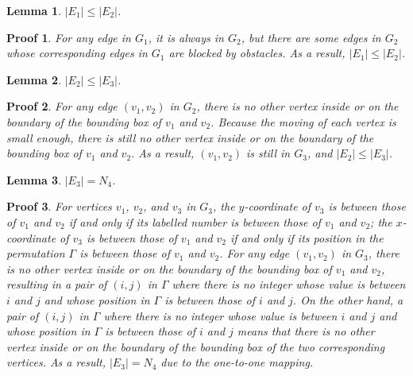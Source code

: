 \documentclass[]{article}
\newtheorem{Lemma}{Lemma}
\newtheorem{Proof}{Proof}
\begin{document}
\begin{qunlist}
{{%

\begin{Lemma}\label{lemma:e1-e2}
$|E_1|\leq |E_2|$.
\end{Lemma}

\begin{Proof}
For any edge in $G_1$, it is always in $G_2$, but there are some edges in $G_2$ whose corresponding edges in $G_1$ are blocked by obstacles. As a result, $|E_1|\leq |E_2|$.
\end{Proof}

\begin{Lemma}\label{lemma:e2-e3}
$|E_2|\leq |E_3|$.
\end{Lemma}

\begin{Proof}
For any edge $(v_1,v_2)$ in $G_2$, there is no other vertex inside or on the boundary of the bounding box of $v_1$ and $v_2$. Because the moving of each vertex is small enough, there is still no other vertex inside or on the boundary of the bounding box of $v_1$ and $v_2$. As a result, $(v_1,v_2)$ is still in $G_3$, and $|E_2|\leq |E_3|$.
\end{Proof}

\begin{Lemma}\label{lemma:e3-n4}
$|E_3|=N_4$.
\end{Lemma}

\begin{Proof}
For vertices $v_1$, $v_2$, and $v_3$ in $G_3$, the $y$-coordinate of $v_3$ is between those of $v_1$ and $v_2$ if and only if its labelled number is between those of $v_1$ and $v_2$; the $x$-coordinate of $v_3$ is between those of $v_1$ and $v_2$ if and only if its position in the permutation $\Gamma$ is between those of $v_1$ and $v_2$. For any edge $(v_1,v_2)$ in $G_3$, there is no other vertex inside or on the boundary of the bounding box of $v_1$ and $v_2$, resulting in a pair of $(i,j)$ in $\Gamma$ where there is no integer whose value is between $i$ and $j$ and whose position in $\Gamma$ is between those of $i$ and $j$. On the other hand, a pair of $(i,j)$ in $\Gamma$ where there is no integer whose value is between $i$ and $j$ and whose position in $\Gamma$ is between those of $i$ and $j$ means that there is no other vertex inside or on the boundary of the bounding box of the two corresponding vertices. As a result, $|E_3|=N_4$ due to the one-to-one mapping.
\end{Proof}

}}
\end{qunlist}
\end{document}
